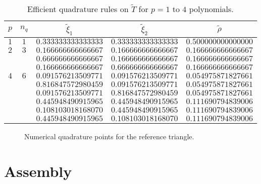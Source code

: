 \begin{table}
  \centering
  \begin{tabular}{ccccc}
    $p$ & $n_q$ & $\tilde \xi_1$ & $\tilde \xi_2$ & $\tilde \rho$ \\
    \hline
    $1$ & $1$ & $0.333333333333333$ & $0.333333333333333$ & $0.500000000000000$ \\
    \hline
    $2$ & $3$ & $0.166666666666667$ & $0.166666666666667$ & $0.166666666666667$ \\ 
    & & $0.666666666666667$ & $0.166666666666667$ & $0.166666666666667$ \\ 
    & & $0.166666666666667$ & $0.666666666666667$ & $0.166666666666667$ \\ 
    \hline
    $4$ & $6$ & $0.091576213509771$ & $0.091576213509771$ & $0.054975871827661$ \\ 
    & & $0.816847572980459$ & $0.091576213509771$ & $0.054975871827661$ \\ 
    & & $0.091576213509771$ & $0.816847572980459$ & $0.054975871827661$ \\ 
    & & $0.445948490915965$ & $0.445948490915965$ & $0.111690794839006$ \\
    & & $0.108103018168070$ & $0.445948490915965$ & $0.111690794839006$ \\ 
    & & $0.445948490915965$ & $0.108103018168070$ & $0.111690794839006$ \\ 
  \end{tabular}
  \caption{Efficient quadrature rules on $\tilde T$ for $p = 1$ to $4$ polynomials.}
  \label{tb:fe_impl_integ_gauss2}
\end{table}

\begin{figure}
  \centering
  \caption{Numerical quadrature points for the reference triangle.}
  \label{fig:fe_impl_integ_gauss2}
\end{figure}

\section{Assembly}
\label{sec:fe_assembly}

